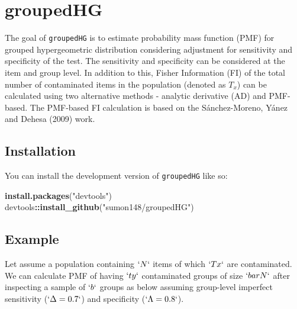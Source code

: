 \documentclass[
]{article}
\author{}
\date{\vspace{-2.5em}}
\newenvironment{Shaded}{\begin{snugshade}}{\end{snugshade}}
\newcommand{\FunctionTok}[1]{\textcolor[rgb]{0.13,0.29,0.53}{\textbf{#1}}}
\newcommand{\NormalTok}[1]{#1}
\newcommand{\SpecialCharTok}[1]{\textcolor[rgb]{0.81,0.36,0.00}{\textbf{#1}}}
\newcommand{\StringTok}[1]{\textcolor[rgb]{0.31,0.60,0.02}{#1}}
\begin{document}
\section{groupedHG}\label{groupedhg}

The goal of \texttt{groupedHG} is to estimate probability mass function
(PMF) for grouped hypergeometric distribution considering adjustment for
sensitivity and specificity of the test. The sensitivity and specificity
can be considered at the item and group level. In addition to this,
Fisher Information (FI) of the total number of contaminated items in the
population (denoted as \(T_x\)) can be calculated using two alternative
methods - analytic derivative (AD) and PMF-based. The PMF-based FI
calculation is based on the Sánchez-Moreno, Yánez and Dehesa (2009)
work.

\subsection{Installation}\label{installation}

You can install the development version of \texttt{groupedHG} like so:

\begin{Shaded}
\begin{Highlighting}[]
\FunctionTok{install.packages}\NormalTok{(}\StringTok{"devtools"}\NormalTok{)}
\NormalTok{devtools}\SpecialCharTok{::}\FunctionTok{install\_github}\NormalTok{(}\StringTok{"sumon148/groupedHG"}\NormalTok{)}
\end{Highlighting}
\end{Shaded}

\subsection{Example}\label{example}

Let assume a population containing \(`N`\) items of which \(`Tx`\) are
contaminated. We can calculate PMF of having \(`ty`\) contaminated
groups of size \(`barN`\) after inspecting a sample of \(`b`\) groups as
below assuming group-level imperfect sensitivity (\(`\Delta=0.7`\)) and
specificity (\(`\Lambda=0.8`\)).
\end{document}
